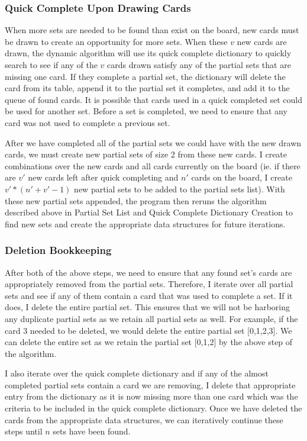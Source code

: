 \documentclass[pageno]{jpaper}
\begin{document}
\subsubsection{Quick Complete Upon Drawing Cards}

When more sets are needed to be found than exist on the board, new cards must be drawn to create an opportunity for more sets. When these $v$ new cards are drawn, the dynamic algorithm will use its quick complete dictionary to quickly search to see if any of the $v$ cards drawn satisfy any of the partial sets that are missing one card. If they complete a partial set, the dictionary will delete the card from its table, append it to the partial set it completes, and add it to the queue of found cards. It is possible that cards used in a quick completed set could be used for another set. Before a set is completed, we need to ensure that any card was not used to complete a previous set. 

After we have completed all of the partial sets we could have with the new drawn cards, we must create new partial sets of size 2 from these new cards. I create combinations over the new cards and all cards currently on the board (ie. if there are $v'$ new cards left after quick completing and $n'$ cards on the board, I create $v'*(n'+v'-1)$ new partial sets to be added to the partial sets list). With these new partial sets appended, the program then reruns the algorithm described above in Partial Set List and Quick Complete Dictionary Creation to find new sets and create the appropriate data structures for future iterations. 

\subsubsection{Deletion Bookkeeping}

After both of the above steps, we need to ensure that any found set's cards are appropriately removed from the partial sets. Therefore, I iterate over all partial sets and see if any of them contain a card that was used to complete a set. If it does, I delete the entire partial set. This ensures that we will not be harboring any duplicate partial sets as we retain all partial sets as well. For example, if the card 3 needed to be deleted, we would delete the entire partial set [0,1,2,3]. We can delete the entire set as we retain the partial set [0,1,2] by the above step of the algorithm. 

I also iterate over the quick complete dictionary and if any of the almost completed partial sets contain a card we are removing, I delete that appropriate entry from the dictionary as it is now missing more than one card which was the criteria to be included in the quick complete dictionary. Once we have deleted the cards from the appropriate data structures, we can iteratively continue these steps until $n$ sets have been found. 
\end{document}
